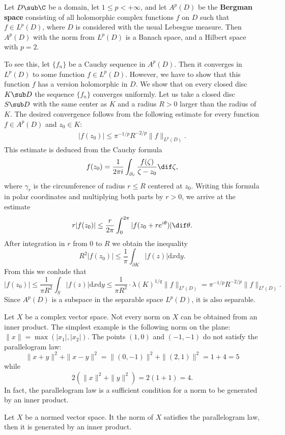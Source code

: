 \begin{example}\label{Bergman space is Banach}
Let $D\sub\C$ be a domain, let $1\leq p<+\infty$, and let $A^p(D)$ be the \textbf{Bergman space} consisting of all holomorphic complex functions $f$ on $D$ such that $f\in L^p(D)$, where $D$ is considered with the usual Lebesgue measure. Then $A^p(D)$ with the norm from $L^p(D)$ is a Banach space, and a Hilbert space with $p=2$.\par
To see this, let $\{f_n\}$ be a Cauchy sequence in $A^p(D)$. Then it converges in $L^p(D)$ to some function $f\in L^p(D)$. However, we have to show that this function $f$ has a version holomorphic in $D$. We show that on every closed disc $K\sub D$ the sequence $\{f_n\}$ converges uniformly. Let us take a closed disc $S\sub D$ with the same center as $K$ and a radius $R>0$ larger than the radius of $K$. The desired convergence follows from the following estimate for every function $f\in A^p(D)$ and $z_0\in K$:
\begin{align}\label{Bergman space is Banach-1}
|f(z_0)|\leq\pi^{-1/p}R^{-2/p}\|f\|_{L^p(D)}.
\end{align}
This estimate is deduced from the Cauchy formula
\[f(z_0)=\frac{1}{2\pi i}\int_{\partial_r}\frac{f(\zeta)}{\zeta-z_0}\dif\zeta,\]
where $\gamma_r$ is the circumference of radius $r\leq R$ centered at $z_0$. Writing this formula in polar coordinates and multiplying both parts by $r>0$, we arrive at the estimate
\[r|f(z_0)|\leq\frac{r}{2\pi}\int_{0}^{2\pi}|f(z_0+re^{i\theta})|\dif\theta.\]
After integration in $r$ from $0$ to $R$ we obtain the inequality
\[R^2|f(z_0)|\leq\frac{1}{\pi}\int_{\partial K}|f(z)|\mathrm{d}x\mathrm{d}y.\]
From this we conlude that
\[|f(z_0)|\leq\frac{1}{\pi R^2}\int_{S}|f(z)|\mathrm{d}x\mathrm{d}y\leq\frac{1}{\pi R^2}\cdot\lambda(K)^{1/q}\|f\|_{L^p(D)}=\pi^{-1/p}R^{-2/p}\|f\|_{L^p(D)}.\]
Since $A^p(D)$ is a subspace in the separable space $L^p(D)$, it is also separable.
\end{example}
Let $X$ be a complex vector space. Not every norm on $X$ can be obtained from an inner product. The simplest example is the following norm on the plane: $\|x\|=\max(|x_1|,|x_2|)$. The points $(1,0)$ and $(-1,-1)$ do not satisfy the parallelogram law:
\[\|x+y\|^2+\|x-y\|^2=\|(0,-1)\|^2+\|(2,1)\|^2=1+4=5\]
while
\[2(\|x\|^2+\|y\|^2)=2(1+1)=4.\]
In fact, the parallelogram law is a sufficient condition for a norm to be generated by an inner product.
\begin{proposition}\label{parallelogram law construct inner product}
Let $X$ be a normed vector space. It the norm of $X$ satisfies the parallelogram law, then it is generated by an inner product.
\end{proposition}
